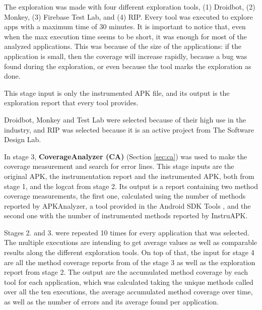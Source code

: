 The exploration was made with four different exploration tools, (1) Droidbot, (2) Monkey, (3) Firebase Test Lab, and (4) RIP.  Every tool was executed to explore  apps with a maximum time of 30 minutes. It is important to notice that, even when the max execution time seems to be short, it was enough for most of the analyzed applications. This was because of the size of the applications: if the application is small, then the coverage will increase rapidly, because a bug was found during the exploration, or even because the tool marks the exploration as done. 

This stage input is only the instrumented APK file, and its output is the exploration report that every tool provides. 
 

Droidbot, Monkey and Test Lab were selected because of their high use in the industry, and RIP was selected because it is an active project from The Software Design Lab. 

In stage 3, \textbf{CoverageAnalyzer (CA)} (Section \ref{sec:ca}) was used to make the coverage measurement and search for error lines. This stage inputs are the original APK, the instrumentation report and the instrumented APK, both from stage 1, and the logcat from stage 2. Its output is a report containing two method coverage measurements, the first one, calculated using the number of methods reported by APKAnalyzer, a tool provided in the Android SDK Tools , and the second one with the number of instrumented methods reported by InstruAPK.


Stages 2. and 3. were repeated 10 times for every application that was selected. The multiple executions are intending to get average values as well as comparable results along the different exploration tools. On top of that, the input for stage 4 are all the method coverage reports from of the stage 3 as well as the exploration report from stage 2. The output are the accumulated method coverage by each tool for each application, which was calculated taking the unique methods called over all the ten executions, the average accumulated method coverage over time, as well as the number of errors and its average found per application.

